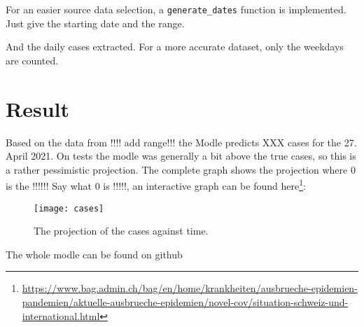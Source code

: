 \documentclass {article}
\begin{document}
For an easier source data selection, a \verb=generate_dates= function is implemented. Just give the starting date and the range.

\newpage
And the daily cases extracted. For a more accurate dataset, only the weekdays are counted.



\section {Result}
Based on the data from !!!! add range!!! the Modle predicts XXX cases for the 27. April 2021.
On tests the modle was generally a bit above the true cases, so this is a rather pessimistic projection.
The complete graph shows the projection where 0 is the !!!!!! Say what 0 is !!!!!, an interactive graph can be found here\footnote{\url{https://www.bag.admin.ch/bag/en/home/krankheiten/ausbrueche-epidemien-pandemien/aktuelle-ausbrueche-epidemien/novel-cov/situation-schweiz-und-international.html}}:
\begin{figure}[h]
    \centering
    \texttt{[image: cases]}
    \caption {The projection of the cases against time.}
    \label{fig:Cases}
\end{figure}


The whole modle	 can be found on github
	
\end{document}
